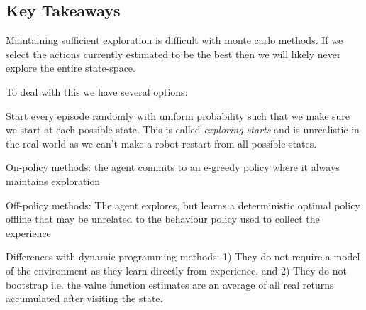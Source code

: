 \subsection{Key Takeaways}

\item Maintaining sufficient exploration is difficult with monte carlo methods. If we select the actions currently estimated to be the best then we will likely never explore the entire state-space.
\item To deal with this we have several options:
\item Start every episode randomly with uniform probability such that we make sure we start at each possible state. This is called \textit{exploring starts} and is unrealistic in the real world as we can't make a robot restart from all possible states.
\item On-policy methods: the agent commits to an e-greedy policy where it always maintains exploration
\item Off-policy methods: The agent explores, but learns a deterministic optimal policy offline that may be unrelated to the behaviour policy used to collect the experience
\item Differences with dynamic programming methods: 1) They do not require a model of the environment as they learn directly from experience, and 2) They do not bootstrap i.e. the value function estimates are an average of all real returns accumulated after visiting the state.